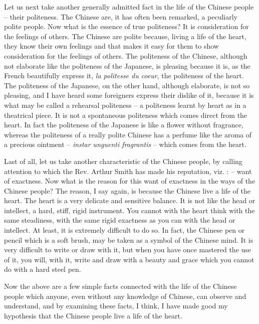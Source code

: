 Let us next take another generally admitted fact in the life of the Chinese people -- their politeness.
The Chinese are, it has often been remarked, a peculiarly polite people.
Now what is the essence of true politeness?
It is consideration for the feelings of others.
The Chinese are polite because, living a life of the heart,
they know their own feelings and that makes it easy for them to show consideration for the feelings of others. The politeness of the Chinese,
although not elaborate like the politeness of the Japanese,
is pleasing because it is, as the French beautifully express it,
\emph{la politesse du coeur}, the politeness of the heart.
The politeness of the Japanese, on the other hand,
although elaborate, is not so pleasing,
and I have heard some foreigners express their dislike of it,
because it is what may be called a rehearsal politeness
-- a politeness learnt by heart as in a theatrical piece.
It is not a spontaneous politeness which comes direct from the heart.
In fact the politeness of the Japanese is like a flower without fragrance,
whereas the politeness of a really polite Chinese has a perfume like the aroma of a precious ointment
-- \emph{instar unguenti fragrantis} --  which comes from the heart.

Last of all, let us take another characteristic of the Chinese people, by calling attention to which the Rev. Arthur Smith has made his reputation, viz. : -- want of exactness. Now what is the reason for this want of exactness in the ways of the Chinese people? The reason, I say again, is because the Chinese live a life of the heart. The heart is a very delicate and sensitive balance. It is not like the head or intellect, a hard, stiff, rigid instrument. You cannot with the heart think with the same steadiness, with the same rigid exactness as you can with the head or intellect. At least, it is extremely difficult to do so. In fact, the Chinese pen or pencil which is a soft brush, may be taken as a symbol of the Chinese mind. It is very difficult to write or draw with it, but when you have once mastered the use of it, you will, with it, write and draw with a beauty and grace which you cannot do with a hard steel pen.

Now the above are a few simple facts connected with the life of the Chinese people which anyone, even without any knowledge of Chinese, can observe and understand, and by examining these facts, I think, I have made good my hypothesis that the Chinese people live a life of the heart.

